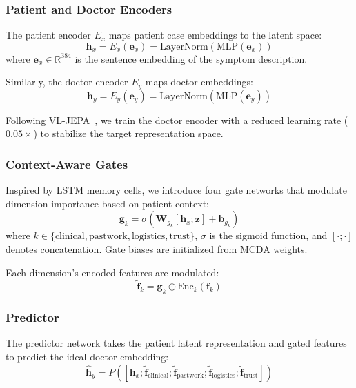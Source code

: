 \documentclass[journal]{IEEEtran}
\begin{document}
\subsubsection{Patient and Doctor Encoders}

The patient encoder $E_x$ maps patient case embeddings to the
latent space:
\begin{equation}
\mathbf{h}_x = E_x(\mathbf{e}_x) = \mathrm{LayerNorm}(\mathrm{MLP}(\mathbf{e}_x))
\end{equation}
where $\mathbf{e}_x \in \mathbb{R}^{384}$ is the sentence
embedding of the symptom description.

Similarly, the doctor encoder $E_y$ maps doctor embeddings:
\begin{equation}
\mathbf{h}_y = E_y(\mathbf{e}_y) = \mathrm{LayerNorm}(\mathrm{MLP}(\mathbf{e}_y))
\end{equation}

Following VL-JEPA~\cite{vljepa2024}, we train the doctor encoder
with a reduced learning rate ($0.05\times$) to stabilize the
target representation space.

\subsubsection{Context-Aware Gates}

Inspired by LSTM memory cells, we introduce four gate networks
that modulate dimension importance based on patient context:
\begin{equation}
\mathbf{g}_k = \sigma(\mathbf{W}_{g_k}[\mathbf{h}_x; \mathbf{z}] + \mathbf{b}_{g_k})
\end{equation}
where $k \in \{\text{clinical}, \text{pastwork}, \text{logistics}, \text{trust}\}$,
$\sigma$ is the sigmoid function, and $[\cdot;\cdot]$ denotes
concatenation. Gate biases are initialized from MCDA weights.

Each dimension's encoded features are modulated:
\begin{equation}
\tilde{\mathbf{f}}_k = \mathbf{g}_k \odot \mathrm{Enc}_k(\mathbf{f}_k)
\end{equation}

\subsubsection{Predictor}

The predictor network takes the patient latent representation
and gated features to predict the ideal doctor embedding:
\begin{equation}
\hat{\mathbf{h}}_y = P([\mathbf{h}_x; \tilde{\mathbf{f}}_{\text{clinical}};
\tilde{\mathbf{f}}_{\text{pastwork}}; \tilde{\mathbf{f}}_{\text{logistics}};
\tilde{\mathbf{f}}_{\text{trust}}])
\end{equation}
\end{document}
